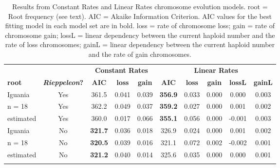 \begin{longtable}{lccccccccc}

\caption{Results from Constant Rates and Linear Rates chromosome evolution models. root = Root frequency (see text). AIC = Akaike Information Criterion. AIC values for the best fitting model in each model set are in bold. loss = rate of chromosome loss; gain = rate of chromosome gain; lossL = linear dependency between the current haploid number and the rate of loss chromosomes; gainL = linear dependency between the current haploid number and the rate of gain chromosomes.
}\\ 
  
\hline
 &  & \multicolumn{3}{c}{\textbf{Constant Rates}} & \multicolumn{5}{c}{\textbf{Linear Rates}} \\
\textbf{root} & \textbf{\textit{Rieppeleon}?} & 
\textbf{AIC} & \textbf{loss} & \textbf{gain} & 
\textbf{AIC} & \textbf{loss} & \textbf{gain} & \textbf{lossL} & \textbf{gainL} \\
\hline
Iguania &
Yes &
361.5 &
0.041 &
0.039 &
\textbf{356.9} &
0.033 &
0.000 &
0.000 &
0.003\\
n = 18 &
Yes &
362.2 &
0.049 &
0.037 &
\textbf{359.2} &
0.027 &
0.000 &
0.001 &
0.002\\
estimated &
Yes &
360.0 &
0.017 &
0.066 &
\textbf{355.1} &
0.056 &
0.000 &
-0.001 &
0.003\\
Iguania &
No &
\textbf{321.7} &
0.036 &
0.018 &
326.9 &
0.024 &
0.000 &
0.001 &
0.002 \\
n = 18  &
No &
\textbf{320.5} &
0.039 &
0.016 &
321.1 &
0.072 &
0.002 &
-0.002 &
0.001\\
estimated &
No &
\textbf{321.2} &
0.040 &
0.014 &
325.6 &
0.035 &
0.000 &
0.000 &
0.001\\
\hline

\label{table-models}
\end{longtable}